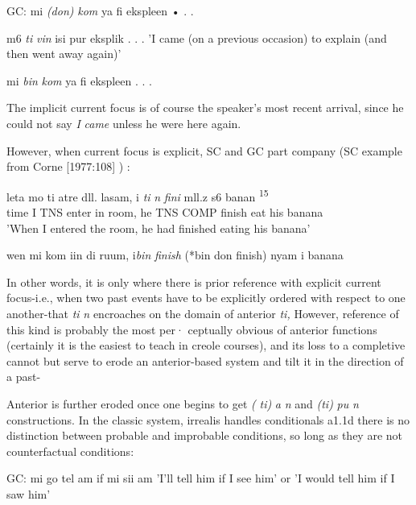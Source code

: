\ea\label{ex:107}
 GC: mi \textit{(don)} \textit{k}\textit{om} ya fi ekspleen • . .
\glt
\z

\ea\label{ex:108}
 m6 \textit{ti} \textit{vin} isi pur eksplik . . .
\glt'I came (on a previous occasion) to explain (and then went away again)'
\z



\ea\label{ex:109}
 mi \textit{bin} \textit{kom} ya fi ekspleen . . .
\glt
\z

The implicit current focus is of course the speaker's most recent arrival, since he could not say \textit{I} \textit{came} unless he were here again.

However, when current focus is explicit, SC and GC part com\-pany (SC example from Corne [1977:108] ) :

\ea\label{ex:110}
\gll leta mo ti atre dll. lasam, i \textit{ti} \textit{n} \textit{fini }mll.z s6 banan \textsuperscript{15}\\
time I TNS enter in room, he TNS COMP finish eat his banana \\
\glt 'When I entered the room, he had finished eating his banana'
\z

\ea\label{ex:111}
 wen mi kom iin di ruum, i\textit{bin} \textit{finish }(*bin don finish) nyam i banana\\
\z



In other words, it is only where there is prior reference with explicit current focus-i.e., when two past events have to be explicitly ordered with respect to one another-that \textit{ti} \textit{n} encroaches on the domain of anterior \textit{ti,} However, reference of this kind is probably the most per· ceptually obvious of anterior functions (certainly it is the easiest to teach in creole courses), and its loss to a completive cannot but serve
to erode an anterior-based system and tilt it in the direction of a past-


Anterior is further eroded once one begins to get \textit{(} \textit{ti)} \textit{a} \textit{n} and \textit{(ti)} \textit{pu} \textit{n} constructions. In the classic system, irrealis handles condi\-tionals a1.1d there is no distinction between probable and improbable conditions, so long as they are not counterfactual conditions:

\ea\label{ex:112}
 GC: mi go tel am if mi sii am
\glt 'I'll tell him if I see him' or 'I would tell him if I saw him'
\z



